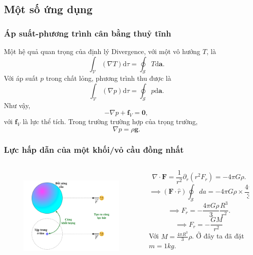 \subsection{Một số ứng dụng}
\begin{frame}
    \frametitle{Áp suất-phương trình cân bằng thuỷ tĩnh}
    Một hệ quả quan trọng của định lý Divergence, với một vô hướng \(T\), là 
    \[\int_{\mathcal{V}}(\nabla T)\text{d}\tau =\oint_{\mathcal{S}}T\text{d}\mathbf{a}.\]
    Với áp suất \(p\) trong chất lỏng, phương trình thu được là 
    \[\int_{\mathcal{V}}(\nabla p)\text{d}\tau =\oint_{\mathcal{S}}p\text{d}\mathbf{a}.\]
    Như vậy, \[-\nabla p +\mathbf{f}_V =\mathbf{0},\] với \(\mathbf{f}_V\) là lực thể tích.
    Trong trường trường hợp của trọng trường,
    \vspace{-5pt}
    \[\nabla p=\rho \mathbf{g}.\]
\end{frame}
\begin{frame}
    \frametitle{Lực hấp dẫn của một khối/vỏ cầu đồng nhất}
    \begin{columns}
        \begin{column}{0.5\textwidth}
            \vspace{-5pt}

             \begin{figure}
        \centering
        \includegraphics[width=7cm, height=5cm]{Content/Figure/gravity.png}
    \end{figure}
        \end{column}
        \begin{column}{0.5\textwidth}
            \scriptsize
            \[\nabla\cdot\mathbf{F}=\frac{1}{r^2}\partial_r(r^2 F_r)=-4\pi G \rho.\]
           \[\implies (\mathbf{F}\cdot\hat{r})\oint_{\mathcal{S}}da =-4\pi G \rho\times \frac{4\pi}{3}R^3.\]
           \[\implies F_r =-\frac{4\pi G\rho}{3} \frac{R^3}{r^2}.\]
           \[\implies F_r =-\frac{GM}{r^2}\]
            Với \(M=\frac{4\pi R^3}{3}\rho\). Ở đây ta đã đặt \(m=1 kg\).
   \end{column}
    \end{columns}
\end{frame}
